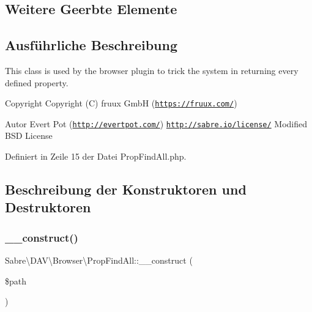 \subsection*{Weitere Geerbte Elemente}


\subsection{Ausführliche Beschreibung}
This class is used by the browser plugin to trick the system in returning every defined property.

\begin{DoxyCopyright}{Copyright}
Copyright (C) fruux GmbH (\href{https://fruux.com/}{\tt https\+://fruux.\+com/}) 
\end{DoxyCopyright}
\begin{DoxyAuthor}{Autor}
Evert Pot (\href{http://evertpot.com/}{\tt http\+://evertpot.\+com/})  \href{http://sabre.io/license/}{\tt http\+://sabre.\+io/license/} Modified B\+SD License 
\end{DoxyAuthor}


Definiert in Zeile 15 der Datei Prop\+Find\+All.\+php.



\subsection{Beschreibung der Konstruktoren und Destruktoren}
\mbox{\label{class_sabre_1_1_d_a_v_1_1_browser_1_1_prop_find_all_aae65b337241a6dd73ef6fc824cb2d500}} 
\subsubsection{\texorpdfstring{\+\_\+\+\_\+construct()}{\_\_construct()}}
{\footnotesize\ttfamily Sabre\textbackslash{}\+D\+A\+V\textbackslash{}\+Browser\textbackslash{}\+Prop\+Find\+All\+::\+\_\+\+\_\+construct (\begin{DoxyParamCaption}\item[{}]{\$path }\end{DoxyParamCaption})}

